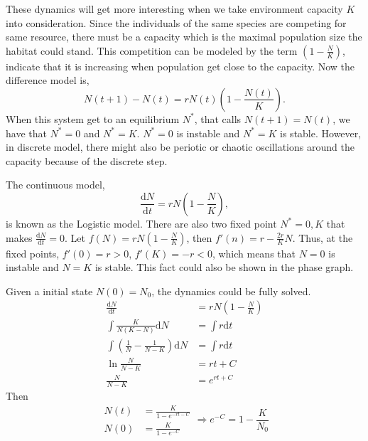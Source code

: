     These dynamics will get more interesting when we take environment capacity $K$ into consideration. Since the individuals of the same species are competing for same resource, there must be a capacity which is the maximal population size the habitat could stand. This competition can be modeled by the term $(1-\frac{N}{K})$, indicate that it is increasing when population get close to the capacity. Now the difference model is,
    \begin{equation}
        N(t+1) - N(t) = rN(t)(1-\frac{N(t)}{K}).
    \end{equation}
    When this system get to an equilibrium $N^*$, that calls $N(t+1) = N(t)$, we have that $N^* = 0$ and $N^* = K$. $N^* = 0$ is instable and $N^*=K$ is stable. However, in discrete model, there might also be periotic or chaotic oscillations around the capacity because of the discrete step.

    The continuous model,
    \begin{equation}
        \frac{\mathrm{d} N}{\mathrm{d}t} = rN(1-\frac{N}{K}),
    \end{equation}
    is known as the Logistic model. There are also two fixed point $N^* = 0, K$ that makes $\frac{\mathrm{d} N}{\mathrm{d}t}=0$. Let $f(N) = rN(1-\frac{N}{K})$, then $f'(n) = r-\frac{2r}{K}N$. Thus, at the fixed points, $f'(0) = r >0$, $f'(K) = -r <0$, which means that $N=0$ is instable and $N = K$ is stable. This fact could also be shown in the phase graph. 
    
    Given a initial state $N(0)=N_{0}$, the dynamics could be fully solved.
    \begin{align*}
        \frac{\mathrm{d} N}{\mathrm{d}t} &= rN(1-\frac{N}{K})\\
        \int \frac{K}{N(K-N)} \mathrm{d}N &= \int r \mathrm{d}t\\
        \int \left( \frac{1}{N} - \frac{1}{N-K} \right) \mathrm{d}N &= \int r \mathrm{d}t\\
        \ln \frac{N}{N-K} &= rt + C\\
        \frac{N}{N-K} &= e^{rt+C}
    \end{align*}
    Then
    \begin{equation*}
        \begin{aligned}
            N(t) &= \frac{K}{1 - e^{-rt-C}}\\
            N(0) &= \frac{K}{1-e^{-C}}
        \end{aligned}
        \Rightarrow
        e^{-C} = 1-\frac{K}{N_0}
    \end{equation*}

